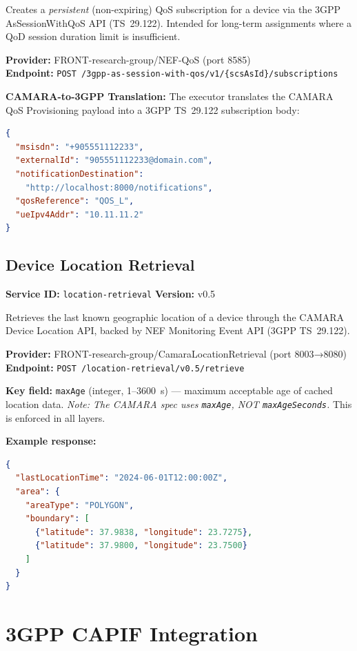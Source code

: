 \documentclass[conference]{IEEEtran}
\begin{document}
Creates a \emph{persistent} (non-expiring) QoS subscription for a device
via the 3GPP AsSessionWithQoS API (TS~29.122). Intended for long-term
assignments where a QoD session duration limit is insufficient.

\textbf{Provider:} FRONT-research-group/NEF-QoS (port 8585) \\
\textbf{Endpoint:} \texttt{POST /3gpp-as-session-with-qos/v1/\{scsAsId\}/subscriptions}

\textbf{CAMARA-to-3GPP Translation:} The executor translates the CAMARA
QoS Provisioning payload into a 3GPP TS~29.122 subscription body:

\begin{lstlisting}[language=json]
{
  "msisdn": "+905551112233",
  "externalId": "905551112233@domain.com",
  "notificationDestination":
    "http://localhost:8000/notifications",
  "qosReference": "QOS_L",
  "ueIpv4Addr": "10.11.11.2"
}
\end{lstlisting}

\subsection{Device Location Retrieval}

\textbf{Service ID:} \texttt{location-retrieval} \quad \textbf{Version:} v0.5

Retrieves the last known geographic location of a device through the CAMARA
Device Location API, backed by NEF Monitoring Event API (3GPP TS~29.122).

\textbf{Provider:} FRONT-research-group/CamaraLocationRetrieval (port 8003→8080)\\
\textbf{Endpoint:} \texttt{POST /location-retrieval/v0.5/retrieve}

\textbf{Key field:} \texttt{maxAge} (integer, 1–3600~s) — maximum acceptable
age of cached location data. \emph{Note: The CAMARA spec uses \texttt{maxAge},
NOT \texttt{maxAgeSeconds}.} This is enforced in all layers.

\textbf{Example response:}
\begin{lstlisting}[language=json]
{
  "lastLocationTime": "2024-06-01T12:00:00Z",
  "area": {
    "areaType": "POLYGON",
    "boundary": [
      {"latitude": 37.9838, "longitude": 23.7275},
      {"latitude": 37.9800, "longitude": 23.7500}
    ]
  }
}
\end{lstlisting}

\section{3GPP CAPIF Integration}
\label{sec:capif}
\end{document}

